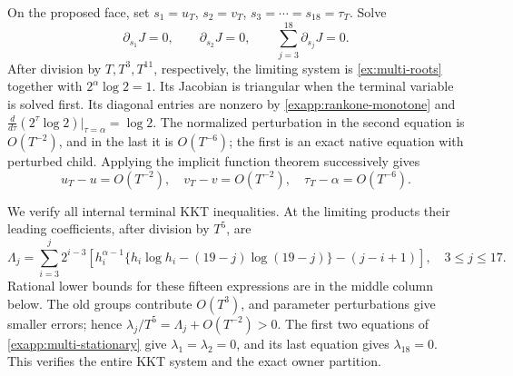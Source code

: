 On the proposed face, set
\(s_1=u_T\), \(s_2=v_T\), \(s_3=\cdots=s_{18}=\tau_T\).
Solve
\begin{equation}
 \partial_{s_1}J=0,\qquad \partial_{s_2}J=0,\qquad
 \sum_{j=3}^{18}\partial_{s_j}J=0.
 \label{exapp:multi-stationary}
\end{equation}
After division by \(T,T^3,T^{11}\), respectively, the limiting
system is \eqref{ex:multi-roots} together with
\(2^\alpha\log2=1\).  Its Jacobian is triangular when the terminal
variable is solved first.  Its diagonal entries are nonzero by
\eqref{exapp:rankone-monotone} and
\(\frac{d}{d\tau}(2^\tau\log2)|_{\tau=\alpha}=\log2\).
The normalized perturbation in the second equation is \(O(T^{-2})\),
and in the last it is \(O(T^{-6})\); the first is an exact native
equation with perturbed child.  Applying the implicit function
theorem successively gives
\begin{equation}
 u_T-u=O(T^{-2}),\quad v_T-v=O(T^{-2}),\quad
 \tau_T-\alpha=O(T^{-6}).
 \label{exapp:multi-convergence}
\end{equation}

We verify all internal terminal KKT inequalities.  At the limiting
products their leading coefficients, after division by \(T^5\), are
\begin{equation}
 \Lambda_j=\sum_{i=3}^j2^{i-3}
 \left[h_i^{\alpha-1}
   \{h_i\log h_i-(19-j)\log(19-j)\}-(j-i+1)\right],
 \quad 3\le j\le17.
 \label{exapp:multi-KKT}
\end{equation}
Rational lower bounds for these fifteen expressions are in the middle
column below.  The old groups contribute \(O(T^3)\), and parameter
perturbations give smaller errors; hence
\(\lambda_j/T^5=\Lambda_j+O(T^{-2})>0\).  The first two equations
of \eqref{exapp:multi-stationary} give \(\lambda_1=\lambda_2=0\),
and its last equation gives \(\lambda_{18}=0\).  This verifies the
entire KKT system and the exact owner partition.

